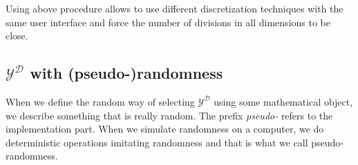 \documentclass[shortabstract]{iithesis}
\begin{document}
Using above procedure allows to use different discretization techniques with the same user interface and force the number of divisions in all dimensions to be close. 












\subsection{$\mathcal{Y}^{\mathcal{D}}$ with (pseudo-)randomness}

When we define the random way of selecting $\mathcal{Y}^{\mathcal{D}}$ using some mathematical object, we describe something that is really random. The prefix \textit{pseudo-} refers to the implementation part. When we simulate randomness on a computer, we do deterministic operations imitating randomness and that is what we call pseudo-randomness. 
\end{document}
